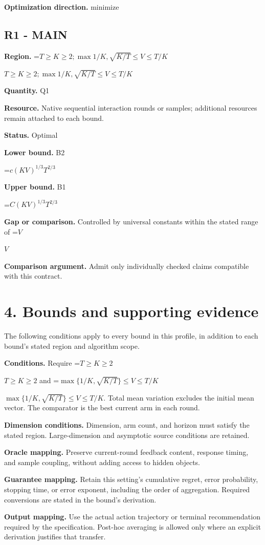\documentclass[10pt,a4paper]{article}
\newcommand{\AtlasMath}[1]{\par\begingroup\centering\setbox0=\hbox{$\displaystyle #1$}\ifdim\wd0>1.4\linewidth\typeout{ATLAS WIDE FORMULA: \the\wd0}\fi\ifdim\wd0>\linewidth\resizebox{\linewidth}{!}{\box0}\else\box0\fi\par\endgroup}
\newcommand{\AtlasInlineMath}[1]{\begingroup\setbox0=\hbox{$#1$}\ifdim\wd0>.4\linewidth\endgroup\AtlasMath{#1}\else\endgroup$#1$\fi}
\begin{document}
\textbf{Optimization direction.} minimize

\subsection{R1 - MAIN}
\textbf{Region.} \AtlasInlineMath{T\ge K\ge 2; \max{1/K,\sqrt{K/T}}\le V\le T/K}

\textbf{Quantity.} Q1

\textbf{Resource.} Native sequential interaction rounds or samples; additional resources remain attached to each bound.

\textbf{Status.} Optimal

\textbf{Lower bound.} B2

\AtlasMath{c(KV)^{1/3}T^{2/3}}
\textbf{Upper bound.} B1

\AtlasMath{C(KV)^{1/3}T^{2/3}}
\textbf{Gap or comparison.} Controlled by universal constants within the stated range of \AtlasInlineMath{V}

\textbf{Comparison argument.} Admit only individually checked claims compatible with this contract.

\section{4. Bounds and supporting evidence}
The following conditions apply to every bound in this profile, in addition to each bound's stated region and algorithm scope.

\textbf{Conditions.} Require \AtlasInlineMath{T\ge K\ge2} and \AtlasInlineMath{\max\{1/K,\sqrt{K/T}\}\le V\le T/K}. Total mean variation excludes the initial mean vector. The comparator is the best current arm in each round.

\textbf{Dimension conditions.} Dimension, arm count, and horizon must satisfy the stated region. Large-dimension and asymptotic source conditions are retained.

\textbf{Oracle mapping.} Preserve current-round feedback content, response timing, and sample coupling, without adding access to hidden objects.

\textbf{Guarantee mapping.} Retain this setting's cumulative regret, error probability, stopping time, or error exponent, including the order of aggregation. Required conversions are stated in the bound's derivation.

\textbf{Output mapping.} Use the actual action trajectory or terminal recommendation required by the specification. Post-hoc averaging is allowed only where an explicit derivation justifies that transfer.
\end{document}
